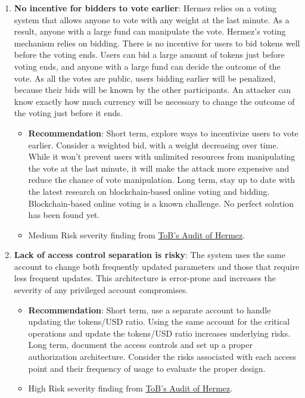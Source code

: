 \begin{enumerate}
\item\textbf{No incentive for bidders to vote earlier}: Hermez relies on a voting system that allows anyone to vote with any weight at the last minute. As a result, anyone with a large fund can manipulate the vote. Hermez’s voting mechanism relies on bidding. There is no incentive for users to bid tokens well before the voting ends. Users can bid a large amount of tokens just before voting ends, and anyone with a large fund can decide the outcome of the vote. As all the votes are public, users bidding earlier will be penalized, because their bids will be known by the other participants. An attacker can know exactly how much currency will be necessary to change the outcome of the voting just before it ends.
	\begin{itemize}
	\item\textbf{Recommendation}: Short term, explore ways to incentivize users to vote earlier. Consider a weighted bid, with a weight decreasing over time. While it won’t prevent users with unlimited resources from manipulating the vote at the last minute, it will make the attack more expensive and reduce the chance of vote manipulation. Long term, stay up to date with the latest research on blockchain-based online voting and bidding. Blockchain-based online voting is a known challenge. No perfect solution has been found yet.
	\item Medium Risk severity finding from \href{https://github.com/trailofbits/publications/blob/master/reviews/hermez.pdf}{ToB’s Audit of Hermez}.
	\end{itemize}

\item\textbf{Lack of access control separation is risky}: The system uses the same account to change both frequently updated parameters and those that require less frequent updates. This architecture is error-prone and increases the severity of any privileged account compromises.
	\begin{itemize}
	\item\textbf{Recommendation}: Short term, use a separate account to handle updating the tokens/USD ratio. Using the same account for the critical operations and update the tokens/USD ratio increases underlying risks. Long term, document the access controls and set up a proper authorization architecture. Consider the risks associated with each access point and their frequency of usage to evaluate the proper design.
	\item High Risk severity finding from \href{https://github.com/trailofbits/publications/blob/master/reviews/hermez.pdf}{ToB’s Audit of Hermez}.
	\end{itemize}


\end{enumerate}
